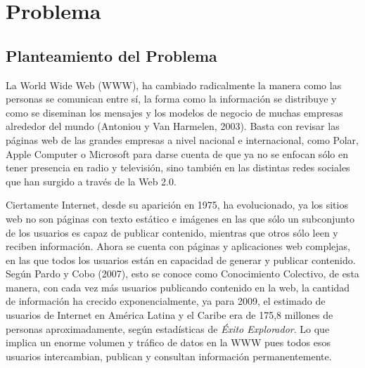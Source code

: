 \chapter{Problema}
\label{chap:problema}


\section{Planteamiento del Problema }

La World Wide Web (WWW), ha cambiado radicalmente la manera como las personas se comunican entre sí, la forma como la información se distribuye y como se diseminan los mensajes y los modelos de negocio de muchas empresas alrededor del mundo (Antoniou y Van Harmelen, 2003). Basta con revisar las páginas web de las grandes empresas a nivel nacional e internacional, como Polar, Apple Computer o Microsoft para darse cuenta de que ya no se enfocan sólo en tener presencia en radio y televisión, sino también en las distintas redes sociales que han surgido a través de la Web 2.0.

Ciertamente Internet, desde su aparición en 1975, ha evolucionado, ya los sitios web no son páginas con texto estático e imágenes en las que sólo un subconjunto de los usuarios es capaz de publicar contenido, mientras que otros sólo leen y reciben información. Ahora se cuenta con páginas y aplicaciones web complejas, en las que todos los usuarios están en capacidad de generar y publicar contenido. Según Pardo y Cobo (2007), esto se conoce como Conocimiento Colectivo, de esta manera, con cada vez más usuarios publicando contenido en la web, la cantidad de información ha crecido exponencialmente, ya para 2009, el estimado de usuarios de Internet en América Latina y el Caribe era de 175,8 millones de personas aproximadamente, según estadísticas de \textit{Éxito Explorador}. Lo que implica un enorme volumen y tráfico de datos en la WWW pues todos esos usuarios intercambian, publican y consultan información permanentemente.

